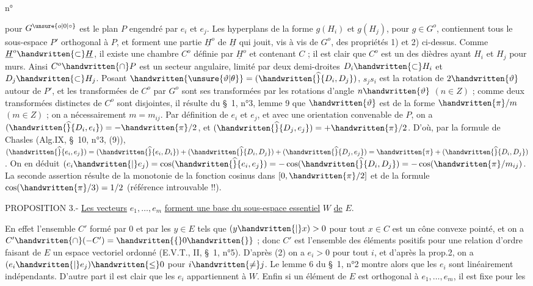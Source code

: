 \begin{flushright}n°\end{flushright}
pour $G^{\unsure{o|0|\circ}}$ est le plan $P$ engendré par $e_i$ et $e_j$. Les hyperplans de la forme $g(H_i)$ et $g(H_j)$, pour $g\in G^o$, contiennent tous le sous-espace $P'$ orthogonal à $P$, et forment une partie $\underline{H}^o$ de $\underline{H}$ qui jouit, vis à vis de $G^o$, des propriétés 1) et 2) ci-dessus. Comme $\underline{H}^o\handwritten{\subset}\underline{H}$, il existe une chambre $C^o$ définie par $\underline{H}^o$ et contenant $C$ ; il est clair que $C^o$ est un des dièdres ayant $H_i$ et $H_j$ pour murs. Ainsi $C^o\handwritten{\cap}P$ est un secteur angulaire, limité par deux demi-droites $D_i\handwritten{\subset}H_i$ et $D_j\handwritten{\subset}H_j$. Posant $\handwritten{\unsure{\vartheta|\theta}}=(\handwritten{\widehat}{D_i,D_j})$, $s_j s_i$ est la rotation de $2\handwritten{\vartheta}$ autour de $P'$, et les transformées de $C^o$ par $G^o$ sont ses transformées par les rotations d'angle $n\handwritten{\vartheta}$ $(n\in Z)$ ; comme deux transformées distinctes de $C^o$ sont disjointes, il résulte du \S\ 1, n°3, lemme 9 que $\handwritten{\vartheta}$ est de la forme $\handwritten{\pi}/m$ $(m\in Z)$ ; on a nécessairement $m=m_{ij}$. Par définition de $e_i$ et $e_j$, et avec une orientation convenable de $P$, on a $(\handwritten{\widehat}{D_i,e_i})=-\handwritten{\pi}/2$, et $(\handwritten{\widehat}{D_j,e_j})=+\handwritten{\pi}/2$. D'où, par la formule de Chasles (Alg.IX, \S\ 10, n°3, (9)), $(\handwritten{\widehat}{e_i,e_j})=(\handwritten{\widehat}{e_i,D_i})+(\handwritten{\widehat}{D_i,D_j})+(\handwritten{\widehat}{D_j,e_j})=\handwritten{\pi}+(\handwritten{\widehat}{D_i,D_j})$. On en déduit $(e_i\handwritten{|}e_j)=\cos(\handwritten{\widehat}{e_i,e_j})=-\cos(\handwritten{\widehat}{D_i,D_j})=-\cos(\handwritten{\pi}/m_{ij})$. La seconde assertion résulte de la monotonie de la fonction cosinus dans $[0,\handwritten{\pi}/2]$ et de la formule $\cos(\handwritten{\pi}/3)=1/2$ (référence introuvable !!).

PROPOSITION 3.- \uline{Les vecteurs} $e_1,\ldots,e_m$ \uline{forment une base du sous-espace essentiel} $W$ \uline{de} $E$.

En effet l'ensemble $C'$ formé par $0$ et par les $y\in E$ tels que $(y\handwritten{|}x)>0$ pour tout $x\in C$ est un cône convexe pointé, et on a $C'\handwritten{\cap}(-C')=\handwritten{\{}0\handwritten{\}}$ ; donc $C'$ est l'ensemble des éléments positifs pour une relation d'ordre faisant de $E$ un espace vectoriel ordonné (E.V.T., II, \S\ 1, n°5). D'après (2) on a $e_i>0$ pour tout $i$, et d'après la prop.2, on a $(e_i\handwritten{|}e_j)\handwritten{\leq}0$ pour $i\handwritten{\ne}j$. Le lemme 6 du \S\ 1, n°2 montre alors que les $e_i$ sont linéairement indépendants. D'autre part il est clair que les $e_i$ appartiennent à $W$. Enfin si un élément de $E$ est orthogonal à $e_1,\ldots,e_m$, il est fixe pour les
